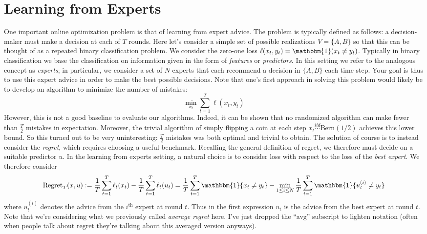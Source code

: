 \documentclass[12pt]{article}
\begin{document}
\section{Learning from Experts}
One important online optimization problem is that of learning from expert advice. The problem is typically defined as follows: a decision-maker must make a decision at each of $T$ rounds. Here let's 
consider a simple set of possible realizations $V = \{A, B\}$ so that this can be thought of as a repeated binary classification problem. We consider the zero-one loss 
$\ell(x_t, y_t) = \mathbbm{1}(x_t \neq y_t)$. Typically in binary classification we base the classification on information 
given in the form of \textit{features} or \textit{predictors}. In this setting we refer to the analogous concept as \textit{experts}; in particular, we consider a set of $N$ experts that each recommend a decision
in $\{A, B\}$ each time step. Your goal is thus to use this expert advice in order to make the best possible decisions. Note that one's first approach in solving this problem would likely be to develop an 
algorithm to minimize the number of mistakes: 
\[\min_{x_t} \sum_{t = 1}^{T} \ell(x_t, y_t)\]
However, this is not a good baseline to evaluate our algorithms. Indeed, it can be shown that no randomized algorithm can make fewer than $\frac{T}{2}$ mistakes in expectation. Moreover, the trivial algorithm 
of simply flipping a coin at each step $x_t \overset{iid}{\sim} \text{Bern}(1/2)$ achieves this lower bound. So this turned out to be very uninteresting: $\frac{T}{2}$ mistakes was both optimal and trivial 
to obtain. The solution of course is to instead consider the \textit{regret}, which requires choosing a useful benchmark. Recalling the general definition of regret, we therefore must decide on a suitable 
predictor $u$. In the learning from experts setting, a natural choice is to consider loss with respect to the loss of the \textit{best expert}. We therefore consider
\[\text{Regret}_T(x, u) := \frac{1}{T} \sum_{t = 1}^{T} \ell_t(x_t) - \frac{1}{T} \sum_{t = 1}^{T} \ell_t(u_t) = \frac{1}{T} \sum_{t = 1}^{T} \mathbbm{1}\{x_t \neq y_t\} - \min_{1 \leq i \leq N} \frac{1}{T} \sum_{t = 1}^{T} \mathbbm{1}\{u^{(i)}_t \neq y_t\}\]
where $u^{(i)}_t$ denotes the advice from the $i^{\text{th}}$ expert at round $t$. Thus in the first expression $u_t$ is the advice from the best expert at round $t$. Note that we're considering what we previously 
called \textit{average regret} here. I've just dropped the ``avg'' subscript to lighten notation (often when people talk about regret they're talking about this averaged version anyways). 
\end{document}
